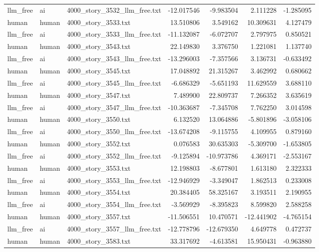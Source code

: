 \begin{longtable}{lllrrrr}
llm\_free & ai & 4000\_story\_3532\_llm\_free.txt & -12.017546 & -9.983504 & 2.111228 & -1.285095 \\
human & human & 4000\_story\_3533.txt & 13.510806 & 3.549162 & 10.309631 & 4.127479 \\
llm\_free & ai & 4000\_story\_3533\_llm\_free.txt & -11.132087 & -6.072707 & 2.797975 & 0.850521 \\
human & human & 4000\_story\_3543.txt & 22.149830 & 3.376750 & 1.221081 & 1.137740 \\
llm\_free & ai & 4000\_story\_3543\_llm\_free.txt & -13.296003 & -7.357566 & 3.136731 & -0.633492 \\
human & human & 4000\_story\_3545.txt & 17.048892 & 21.315267 & 3.462992 & 0.680662 \\
llm\_free & ai & 4000\_story\_3545\_llm\_free.txt & -6.686329 & -5.651193 & 11.629559 & 3.688110 \\
human & human & 4000\_story\_3547.txt & 7.489900 & 22.809737 & 7.266352 & 3.635619 \\
llm\_free & ai & 4000\_story\_3547\_llm\_free.txt & -10.363687 & -7.345708 & 7.762250 & 3.014598 \\
human & human & 4000\_story\_3550.txt & 6.132520 & 13.064886 & -5.801896 & -3.058106 \\
llm\_free & ai & 4000\_story\_3550\_llm\_free.txt & -13.674208 & -9.115755 & 4.109955 & 0.879160 \\
human & human & 4000\_story\_3552.txt & 0.076583 & 30.635303 & -5.309700 & -1.653805 \\
llm\_free & ai & 4000\_story\_3552\_llm\_free.txt & -9.125894 & -10.973786 & 4.369171 & -2.553167 \\
human & human & 4000\_story\_3553.txt & 12.198803 & -8.677801 & 1.613180 & 2.322333 \\
llm\_free & ai & 4000\_story\_3553\_llm\_free.txt & -12.946929 & -3.349047 & 1.862513 & 0.233008 \\
human & human & 4000\_story\_3554.txt & 20.384405 & 58.325167 & 3.193511 & 2.190955 \\
llm\_free & ai & 4000\_story\_3554\_llm\_free.txt & -3.569929 & -8.395823 & 8.599820 & 2.588258 \\
human & human & 4000\_story\_3557.txt & -11.506551 & 10.470571 & -12.441902 & -4.765154 \\
llm\_free & ai & 4000\_story\_3557\_llm\_free.txt & -12.778796 & -12.679350 & 4.649778 & 0.472737 \\
human & human & 4000\_story\_3583.txt & 33.317692 & -4.613581 & 15.950431 & -0.963880 \\

\end{longtable}
